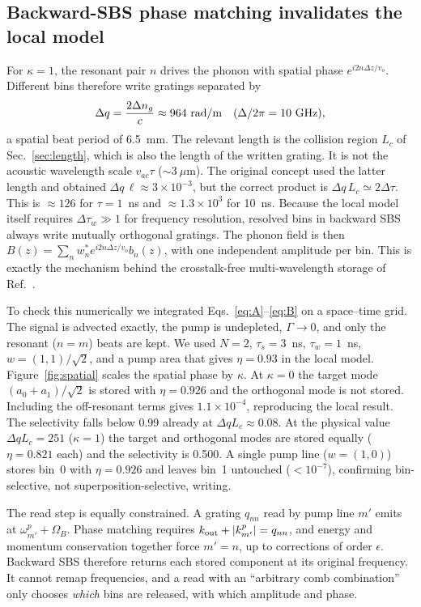 \documentclass[reprint,amsmath,amssymb,aps,prapplied,superscriptaddress,floatfix]{revtex4-2}
\begin{document}
\subsection{Backward-SBS phase matching invalidates the local model}\label{sec:phase}
For $\kappa=1$, the resonant pair $n$ drives the phonon with spatial phase $e^{i2n\Delta z/v_o}$. Different bins therefore write gratings separated by
\begin{equation}
\Delta q=\frac{2\Delta n_g}{c}\approx 964~{\rm rad/m}\quad(\Delta/2\pi=10~{\rm GHz}),\label{eq:dq}
\end{equation}
a spatial beat period of 6.5~mm. The relevant length is the collision region $L_c$ of Sec.~\ref{sec:length}, which is also the length of the written grating. It is not the acoustic wavelength scale $v_{ac}\tau$ ($\sim3~\mu$m). The original concept used the latter length and obtained $\Delta q\,\ell\approx3\times10^{-3}$, but the correct product is $\Delta q\,L_c\simeq2\Delta\tau$. This is $\approx126$ for $\tau=1$~ns and $\approx1.3\times10^3$ for 10~ns. Because the local model itself requires $\Delta\tau_w\gg1$ for frequency resolution, resolved bins in backward SBS always write mutually orthogonal gratings. The phonon field is then $B(z)=\sum_n w_n^*e^{i2n\Delta z/v_o}b_n(z)$, with one independent amplitude per bin. This is exactly the mechanism behind the crosstalk-free multi-wavelength storage of Ref.~\cite{Stiller2019}.

To check this numerically we integrated Eqs.~\eqref{eq:A}--\eqref{eq:B} on a space--time grid. The signal is advected exactly, the pump is undepleted, $\Gamma\to0$, and only the resonant ($n=m$) beats are kept. We used $N=2$, $\tau_s=3$~ns, $\tau_w=1$~ns, $w=(1,1)/\sqrt2$, and a pump area that gives $\eta=0.93$ in the local model. Figure~\ref{fig:spatial} scales the spatial phase by $\kappa$. At $\kappa=0$ the target mode $(a_0+a_1)/\sqrt2$ is stored with $\eta=0.926$ and the orthogonal mode is not stored. Including the off-resonant terms gives $1.1\times10^{-4}$, reproducing the local result. The selectivity falls below 0.99 already at $\Delta qL_c\approx0.08$. At the physical value $\Delta q L_c=251$ ($\kappa=1$) the target and orthogonal modes are stored equally ($\eta=0.821$ each) and the selectivity is 0.500. A single pump line ($w=(1,0)$) stores bin~0 with $\eta=0.926$ and leaves bin~1 untouched ($<10^{-7}$), confirming bin-selective, not superposition-selective, writing.

The read step is equally constrained. A grating $q_{nn}$ read by pump line $m'$ emits at $\omega^p_{m'}+\Omega_B$. Phase matching requires $k_{\rm out}+|k^p_{m'}|=q_{nn}$, and energy and momentum conservation together force $m'=n$, up to corrections of order $\epsilon$. Backward SBS therefore returns each stored component at its original frequency. It cannot remap frequencies, and a read with an ``arbitrary comb combination'' only chooses \emph{which} bins are released, with which amplitude and phase.
\end{document}
